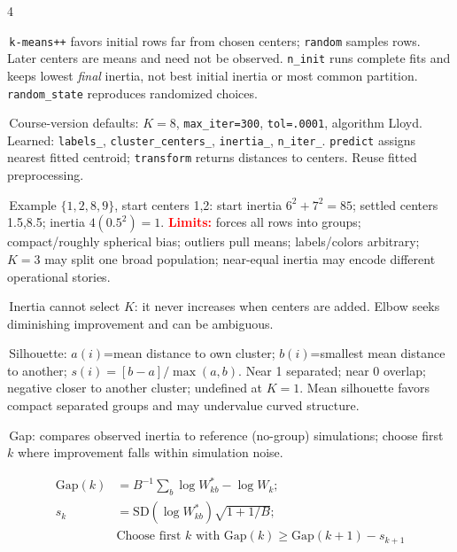 \documentclass[10pt]{article}
\newcommand{\topic}[1]{\vspace{2.5ex}{\color{blue}\bfseries\fontsize{6.0}{6.1}\selectfont #1}\par\vspace{0.1pt}}
\newcommand{\trap}[1]{\textcolor{red}{\textbf{#1}}}
\newcommand{\code}[1]{\texttt{#1}}
\newcommand{\bitem}{\par\vspace{0.8ex}\hangindent=0.09in\hangafter=1\textbullet\,}
\begin{document}
\begin{multicols*}{4}
\bitem \code{k-means++} favors initial rows far from chosen centers; \code{random} samples rows. Later centers are means and need not be observed. \code{n\_init} runs complete fits and keeps lowest \emph{final} inertia, not best initial inertia or most common partition. \code{random\_state} reproduces randomized choices.
\bitem Course-version defaults: $K=8$, \code{max\_iter=300}, \code{tol=.0001}, algorithm Lloyd. Learned: \code{labels\_}, \code{cluster\_centers\_}, \code{inertia\_}, \code{n\_iter\_}. \code{predict} assigns nearest fitted centroid; \code{transform} returns distances to centers. Reuse fitted preprocessing.
\bitem Example $\{1,2,8,9\}$, start centers 1,2: start inertia $6^2+7^2=85$; settled centers 1.5,8.5; inertia $4(0.5^2)=1$.
\trap{Limits:} forces all rows into groups; compact/roughly spherical bias; outliers pull means; labels/colors arbitrary; $K=3$ may split one broad population; near-equal inertia may encode different operational stories.

\topic{CHOOSING K}
\bitem Inertia cannot select $K$: it never increases when centers are added. Elbow seeks diminishing improvement and can be ambiguous.
\bitem Silhouette: $a(i)$=mean distance to own cluster; $b(i)$=smallest mean distance to another; $s(i)=[b-a]/\max(a,b)$. Near 1 separated; near 0 overlap; negative closer to another cluster; undefined at $K=1$. Mean silhouette favors compact separated groups and may undervalue curved structure.
\bitem Gap: compares observed inertia to reference (no-group) simulations; choose first $k$ where improvement falls within simulation noise.

\vspace{-2ex} %
{\centering
\setlength{\abovedisplayskip}{0pt}      %
\setlength{\belowdisplayskip}{0pt}      %
\setlength{\abovedisplayshortskip}{0pt}
\setlength{\belowdisplayshortskip}{0pt}
\fontsize{6}{6}\selectfont 
\begin{align*}
    \mathrm{Gap}(k) &= B^{-1}\sum_b\log W^*_{kb}-\log W_k ; \\[0.5ex]
    s_k &= \text{SD}(\log W^*_{kb})\sqrt{1+1/B} ; \\[0.8ex]
    &\text{Choose first } k \text{ with } \mathrm{Gap}(k) \ge \mathrm{Gap}(k+1)-s_{k+1}
\end{align*}
\par}
\vspace{2ex} %


\end{multicols*}
\end{document}
